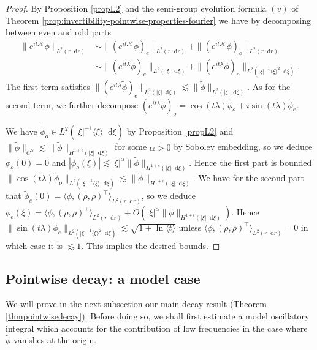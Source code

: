 \documentclass[11 pt]{amsart}
\theoremstyle{definition}
\theoremstyle{remark}
\numberwithin{equation}{section}
\newcommand{\dd}{\mathop{}\!\mathrm{d}}
\begin{document}
\begin{proof}
By Proposition \ref{propL2} and the semi-group evolution formula $(v)$ of Theorem \ref{prop:invertibility-pointwise-properties-fourier} we have by decomposing between even and odd parts
\begin{align*}
\| e^{it\mathcal H}\phi\|_{L^2(r\dd r)} & \sim \| (e^{it\mathcal H}\phi)_e\|_{L^2(r\dd r)}+\| (e^{it\mathcal H}\phi)_o\|_{L^2(r\dd r)} \\
 & \sim \| (e^{it\lambda}\widetilde \phi)_e\|_{L^2(|\xi|\dd \xi)}+\| (e^{it\lambda}\widetilde \phi)_o\|_{L^2(|\xi|^{-1}\langle \xi \rangle^2\dd \xi)}.
\end{align*}
The first term satisfies $\| (e^{it\lambda}\widetilde \phi)_e\|_{L^2(|\xi|\dd \xi)}\lesssim \| \widetilde{\phi}\|_{L^2(|\xi|\dd \xi)}$. As for the second term, we further decompose $(e^{it\lambda}\widetilde \phi)_o= \cos(t\lambda)\widetilde \phi_o+i\sin(t\lambda)\widetilde \phi_{e}$.

We have $\widetilde \phi_o\in L^2(|\xi|^{-1}\langle \xi \rangle \dd \xi)$ by Proposition \ref{propL2} and $\| \widetilde \phi\|_{C^{\alpha}}\lesssim \| \widetilde{\phi}\|_{H^{1+\epsilon}(|\xi|\dd \xi)}$ for some $\alpha>0$ by Sobolev embedding, so we deduce $\phi_o(0)=0$ and $|\phi_o(\xi)|\lesssim |\xi|^{\alpha} \| \widetilde{\phi}\|_{H^{1+\epsilon}(|\xi|\dd \xi)}$. Hence the first part is bounded $\|\cos(t\lambda)\widetilde \phi_o\|_{L^2(|\xi|^{-1}\langle \xi \rangle \dd \xi)} \lesssim  \| \widetilde{\phi}\|_{H^{1+\epsilon}(|\xi|\dd \xi)} $. We have for the second part that $\widetilde \phi_e(0)= \langle \phi,(\rho,\rho)^\top\rangle_{L^2(r\dd r)}$, so we deduce $\widetilde \phi_e(\xi)= \langle \phi,(\rho,\rho)^\top\rangle_{L^2(r\dd r)}+O(|\xi|^{\alpha} \| \widetilde{\phi}\|_{H^{1+\epsilon}(|\xi|\dd \xi)})$. Hence  $\| \sin(t\lambda)\widetilde \phi_e\|_{L^2(|\xi|^{-1}\langle \xi\rangle^2\dd \xi)}\lesssim \sqrt{1+ \ln \langle t \rangle}$ unless $\langle \phi, (\rho,\rho)^\top\rangle_{L^2(r\dd r)}=0$ in which case it is $\lesssim 1$. This implies the desired bounds.
\end{proof}


\subsection{Pointwise decay: a model case}

We will prove in the next subsection our main decay result (Theorem \ref{thmpointwisedecay}). Before doing so, we shall first estimate a model oscillatory integral which accounts for the contribution of low frequencies in the case where $\widetilde{\phi}$ vanishes at the origin.
\end{document}
